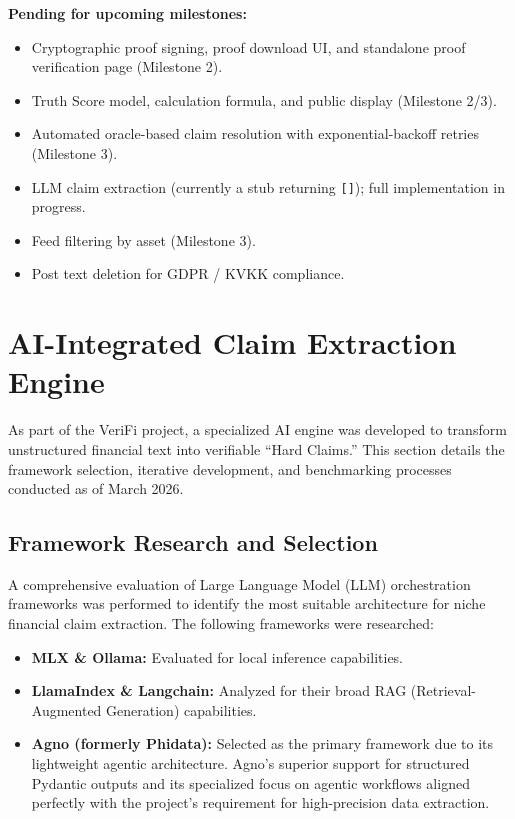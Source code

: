 \documentclass[a4paper,12pt]{report}
\begin{document}
\textbf{Pending for upcoming milestones:}
\begin{itemize}
    \item Cryptographic proof signing, proof download UI, and standalone proof verification page (Milestone 2).
    \item Truth Score model, calculation formula, and public display (Milestone 2/3).
    \item Automated oracle-based claim resolution with exponential-backoff retries (Milestone 3).
    \item LLM claim extraction (currently a stub returning \texttt{[]}); full implementation in progress.
    \item Feed filtering by asset (Milestone 3).
    \item Post text deletion for GDPR / KVKK compliance.
\end{itemize}

\section{AI-Integrated Claim Extraction Engine}

As part of the VeriFi project, a specialized AI engine was developed to transform unstructured financial text into verifiable ``Hard Claims.'' This section details the framework selection, iterative development, and benchmarking processes conducted as of March 2026.

\subsection{Framework Research and Selection}

A comprehensive evaluation of Large Language Model (LLM) orchestration frameworks was performed to identify the most suitable architecture for niche financial claim extraction. The following frameworks were researched:
\begin{itemize}
    \item \textbf{MLX \& Ollama:} Evaluated for local inference capabilities.
    \item \textbf{LlamaIndex \& Langchain:} Analyzed for their broad RAG (Retrieval-Augmented Generation) capabilities.
    \item \textbf{Agno (formerly Phidata):} Selected as the primary framework due to its lightweight agentic architecture. Agno's superior support for structured Pydantic outputs and its specialized focus on agentic workflows aligned perfectly with the project's requirement for high-precision data extraction.
\end{itemize}
\end{document}
